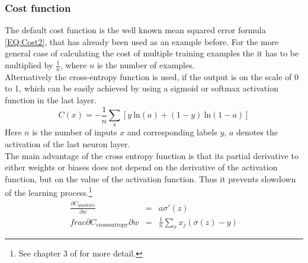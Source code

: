 		\subsubsection{Cost function}
			The default cost function is the well known mean squared error formula \ref{EQ:Cost2}, that has already been used as an example before. For the more general case of calculating the cost of multiple training examples the it has to be multiplied by $\frac{1}{n}$, where $n$ is the number of examples.\\
			Alternatively the cross-entropy function is used, if the output is on the scale of 0 to 1, which can be easily achieved by using a sigmoid or softmax activation function in the last layer.
			\begin{equation}
				C(x) = -\frac{1}{n} \sum_{x} \left[ y \: \mathrm{ln}(a) + (1-y) \: \mathrm{ln}(1-a) \right]
				\label{EQ:CostCrossEntropy}
			\end{equation}
			Here $n$ is the number of inputs $x$ and corresponding labels $y$, $a$ denotes the activation of the last neuron layer.\\
			The main advantage of the cross entropy function is that its partial derivative to either weights or biases does not depend on the derivative of the activation function, but on the value of the activation function. Thus it prevents slowdown of the learning process.\footnote{See chapter 3 of \cite{NNEBook} for more detail.}
			\begin{eqnarray}
				\frac{\partial C_{\mathrm{quadratic}}}{\partial w} & = & a \sigma'(z)\\
				frac{\partial C_{\mathrm{cross entropy}}}{\partial w} & = & \frac{1}{n} \sum_{x} x_j (\sigma(z)-y) 
			\end{eqnarray}

